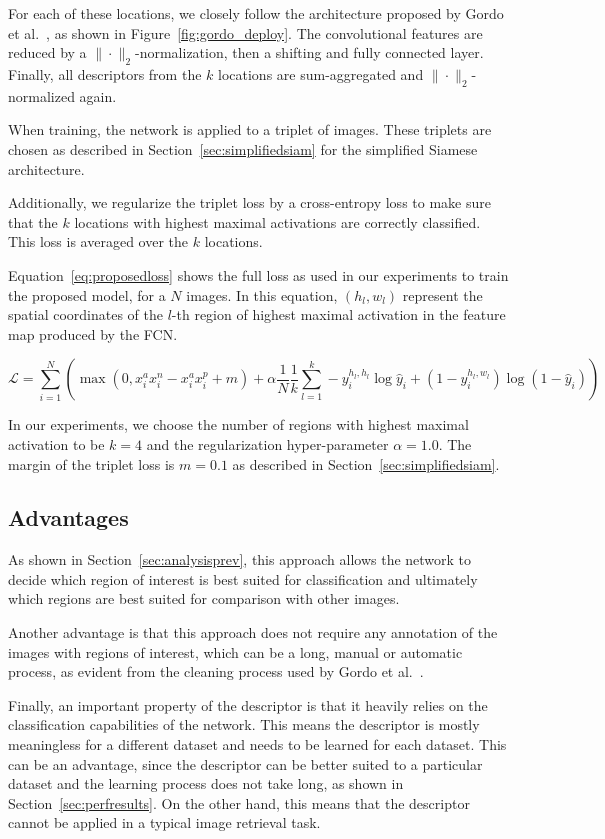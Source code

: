 For each of these locations, we closely follow the architecture
proposed by Gordo et al.~\cite{gordo_deep_2016}, as shown in
Figure~\ref{fig:gordo_deploy}. The convolutional features are
reduced by a $\|\cdot\|_2$-normalization, then a shifting and fully connected
layer. Finally, all descriptors from the $k$ locations are
sum-aggregated and $\|\cdot\|_2$-normalized again.

When training, the network is applied to a triplet of images.
These triplets are chosen as described in Section~\ref{sec:simplifiedsiam}
for the simplified Siamese architecture.

Additionally, we regularize the triplet loss by a cross-entropy loss
to make sure that the $k$ locations with highest
maximal activations are correctly classified. This loss is averaged over
the $k$ locations.

Equation~\ref{eq:proposedloss} shows the full loss as used in our
experiments to train the proposed model, for a $N$ images. In this
equation, $(h_l, w_l)$ represent the spatial coordinates of the $l$-th
region of highest maximal activation in the feature map produced by
the FCN.

\begin{equation}\label{eq:proposedloss}
\mathcal{L} = \sum_{i=1}^N \left( \max(0, x^a_i x^n_i - x^a_i x^p_i + m) +
\alpha \frac{1}{N} \frac{1}{k} \sum_{l=1}^k -
y_i^{h_l,h_l} \log \hat{y}_i + (1-y_i^{h_l,w_l}) \log (1-\hat{y}_i) \right)
\end{equation}

In our experiments, we choose the number of regions with highest maximal
activation to be $k=4$ and the regularization hyper-parameter $\alpha=1.0$.
The margin of the triplet loss is $m=0.1$ as described in
Section~\ref{sec:simplifiedsiam}.

\subsection{Advantages}
As shown in Section~\ref{sec:analysisprev}, this approach
allows the network to decide which region of interest is
best suited for classification and ultimately which regions
are best suited for comparison with other images.

Another advantage is that this approach does not require
any annotation of the images with regions of interest,
which can be a long, manual or automatic process, as evident
from the cleaning process used by Gordo et al.~\cite{gordo_end--end_2016}.

Finally, an important property of the descriptor is that it
heavily relies on the classification
capabilities of the network. This means the descriptor is
mostly meaningless for a different dataset and needs
to be learned for each dataset. This can be an advantage,
since the descriptor can be better suited to a particular
dataset and the learning process does not take long, as shown
in Section~\ref{sec:perfresults}. On the other hand, this means that
the descriptor cannot be applied in a typical image retrieval
task.
